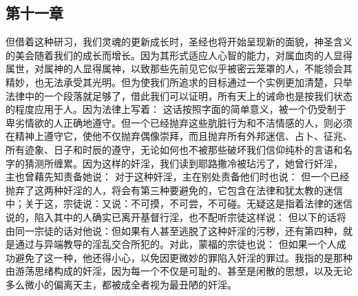 
\subsection{第十一章}

\par

但借着这种研习，我们灵魂的更新成长时，圣经也将开始呈现新的面貌，神圣含义的美会随着我们的成长而增长。因为其形式适应人心智的能力，对属血肉的人显得属世，对属神的人显得属神，以致那些先前见它似乎被密云笼罩的人，不能领会其精妙，也无法承受其光明。但为使我们所追求的目标通过一个实例更加清楚，只举法律中的一个段落就足够了，借此我们可以证明，所有天上的诫命也是按我们状态的程度应用于人。因为法律上写着： 这话按照字面的简单意义，被一个仍受制于卑劣情欲的人正确地遵守。但一个已经抛弃这些肮脏行为和不洁情感的人，则必须在精神上遵守它，使他不仅抛弃偶像崇拜，而且抛弃所有外邦迷信、占卜、征兆、所有迹象、日子和时辰的遵守，无论如何也不被那些破坏我们信仰纯朴的言语和名字的猜测所缠累。因为这样的奸淫，我们读到耶路撒冷被玷污了，她曾行奸淫， 主也曾藉先知责备她说： 对于这种奸淫，主在别处责备他们时也说： 但一个已经抛弃了这两种奸淫的人，将会有第三种要避免的，它包含在法律和犹太教的迷信中；关于这，宗徒说：又说：不可摸，不可尝，不可碰。无疑这是指着法律的迷信说的，陷入其中的人确实已离开基督行淫，也不配听宗徒这样说： 但以下的话将由同一宗徒的话对他说：但如果有人甚至逃脱了这种奸淫的污秽，还有第四种，就是通过与异端教导的淫乱交合所犯的。对此，蒙福的宗徒也说： 但如果一个人成功避免了这一种，他还得小心，以免因更微妙的罪陷入奸淫的罪过。我指的是那种由游荡思绪构成的奸淫，因为每一个不仅是可耻的、甚至是闲散的思想，以及无论多么微小的偏离天主，都被成全者视为最丑陋的奸淫。\par


